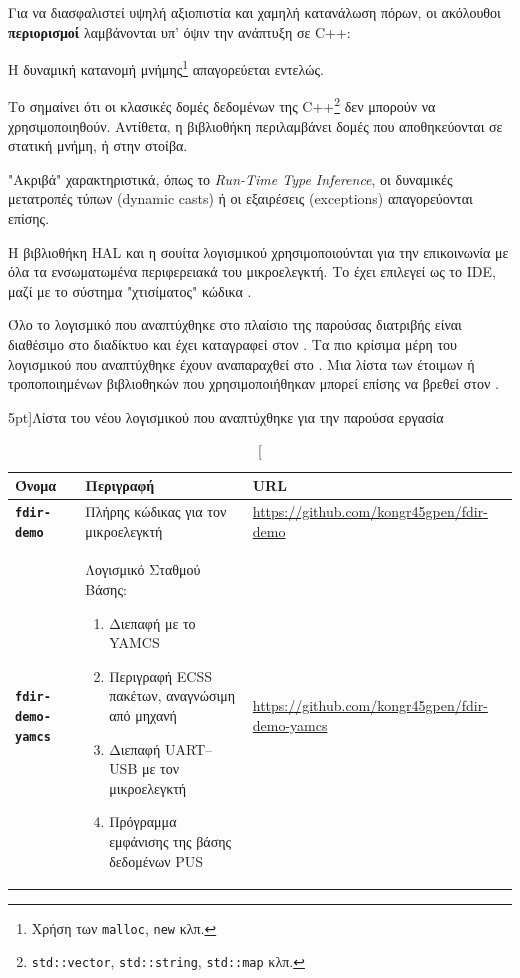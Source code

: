 \documentclass[a4paper,nobib]{tufte-book}
\begin{document}
Για να διασφαλιστεί υψηλή αξιοπιστία και χαμηλή κατανάλωση πόρων, οι ακόλουθοι \textbf{περιορισμοί} λαμβάνονται υπ' όψιν την ανάπτυξη σε C++:
\begin{compactenum}
	\item Η δυναμική κατανομή μνήμης\footnote{Χρήση των \texttt{malloc}, \texttt{new} κλπ.} απαγορεύεται εντελώς.
	\label{itm:malloc}
	\item Το  σημαίνει ότι οι κλασικές δομές δεδομένων της C++\footnote{\texttt{std::vector}, \texttt{std::string}, \texttt{std::map} κλπ.} δεν μπορούν να χρησιμοποιηθούν. Αντίθετα, η βιβλιοθήκη  περιλαμβάνει δομές που αποθηκεύονται σε στατική μνήμη, ή στην στοίβα.
	\item "Ακριβά" χαρακτηριστικά, όπως το \emph{Run-Time Type Inference}, οι δυναμικές μετατροπές τύπων (dynamic casts) ή οι εξαιρέσεις (exceptions) απαγορεύονται επίσης.
\end{compactenum}

Η βιβλιοθήκη \ac{HAL} και η σουίτα λογισμικού   χρησιμοποιούνται για την επικοινωνία με όλα τα ενσωματωμένα περιφερειακά του μικροελεγκτή. Το  έχει επιλεγεί ως το \acs{IDE}, μαζί με το σύστημα "χτισίματος" κώδικα .

Όλο το λογισμικό που αναπτύχθηκε στο πλαίσιο της παρούσας διατριβής είναι διαθέσιμο στο διαδίκτυο και έχει καταγραφεί στον . Τα πιο κρίσιμα μέρη του λογισμικού που αναπτύχθηκε έχουν αναπαραχθεί στο . Μια λίστα των έτοιμων ή τροποποιημένων βιβλιοθηκών που χρησιμοποιήθηκαν μπορεί επίσης να βρεθεί στον .


\begin{table}[h]
	\centering
	\caption[][5pt]{Λίστα του νέου λογισμικού που αναπτύχθηκε για την παρούσα εργασία}
	\label{tab:new_software}
	\begin{tabularx}{\textwidth}{@{}lXp{6cm}@{}}
		\toprule
		Όνομα & Περιγραφή & URL \\ \midrule
		\textbf{\texttt{fdir-demo}} & Πλήρης κώδικας για τον μικροελεγκτή  & \small \url{https://github.com/kongr45gpen/fdir-demo} \\
		\textbf{\texttt{fdir-demo-yamcs}} & Λογισμικό Σταθμού Βάσης: \begin{enumerate}
			\item Διεπαφή με το \acs{YAMCS}
			\item Περιγραφή \acs{ECSS} πακέτων, αναγνώσιμη από μηχανή
			\item Διεπαφή \acs{UART}--\acs{USB} με τον μικροελεγκτή
			\item Πρόγραμμα εμφάνισης της βάσης δεδομένων \acs{PUS}\vspace*{-2ex}
			\end{enumerate} & \small \url{https://github.com/kongr45gpen/fdir-demo-yamcs} \\
		\bottomrule
	\end{tabularx}
\end{table}
\end{document}
